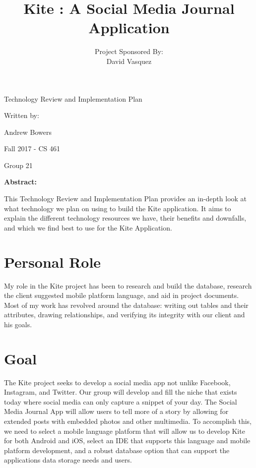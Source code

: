 \documentclass[letterpaper, 10, draftclsnofoot, onecolumn]{IEEEtran}
\date{}
\title{Kite : A Social Media Journal Application}
\author{ %
	Project Sponsored By: \\
    David Vasquez
}
\begin{document}
\null  %
\nointerlineskip  %
\vfill
\let\snewpage \newpage
\let\newpage \relax
\maketitle
\begin{center}
\huge{Technology Review and Implementation Plan}\par
\vspace{2mm}
\large{Written by:}\par
\normalsize{Andrew Bowers}\par
\vspace{2mm}
\normalsize{Fall 2017 - CS 461}\par
\vspace{4mm}
\large{Group 21}\par
\vspace{8mm}
\large{\textbf{Abstract:}}\par 
\vspace{2mm}
\normalsize{This Technology Review and Implementation Plan provides an in-depth look at what technology we plan on using to build the Kite application. It aims to explain the different technology resources we have, their benefits and downfalls, and which we find best to use for the Kite Application.}
\end{center}
\let \newpage \snewpage
\vfill 
\break %

\section*{\textbf{Personal Role}} My role in the Kite project has been to research and build the database, research the client suggested mobile platform language, and aid in project documents. Most of my work has revolved around the database: writing out tables and their attributes, drawing relationships, and verifying its integrity with our client and his goals.   

\section*{\textbf{Goal}} The Kite project seeks to develop a social media app not unlike Facebook, Instagram, and Twitter. Our group will develop and fill the niche that exists today where social media can only capture a snippet of your day. The Social Media Journal App will allow users to tell more of a story by allowing for extended posts with embedded photos and other multimedia. To accomplish this, we need to select a mobile language platform that will allow us to develop Kite for both Android and iOS, select an IDE that supports this language and mobile platform development, and a robust database option that can support the applications data storage needs and users. 
\end{document}
